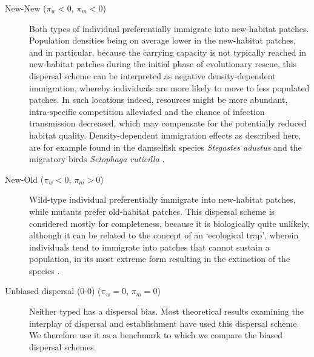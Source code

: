 \documentclass[a4paper,11pt]{article}
\begin{document}
\begin{description}
	\item[New-New ($\pi_w<0$, $\pi_m<0$)]  Both types of individual preferentially immigrate into new-habitat patches. Population densities being on average lower in the new-habitat patches, and in particular, because the carrying capacity is not typically reached in new-habitat patches during the initial phase of evolutionary rescue, this dispersal scheme can be interpreted as negative density-dependent immigration, whereby individuals are more likely to move to less populated patches. In such locations indeed, resources might be more abundant, intra-specific competition alleviated and the chance of infection transmission decreased, which may compensate for the potentially reduced habitat quality.  
	Density-dependent immigration effects as described here, are for example found in the damselfish species \textit{Stegastes adustus} \citep{turgeon_2012} and the migratory birds \textit{Setophaga ruticilla} \citep{wilson_2017}. %
	
	\item[New-Old ($\pi_w<0$, $\pi_m>0$)] Wild-type individual preferentially immigrate into new-habitat patches, while mutants prefer old-habitat patches. This dispersal scheme is considered mostly for completeness, because it is biologically quite unlikely, although it can be related to the concept of an `ecological trap', wherein individuals tend to immigrate into patches that cannot sustain a population, in its most extreme form resulting in the extinction of the species \citep{battin_2004}. 
	
	\item[Unbiased dispersal (0-0) ($\pi_w=0$, $\pi_m=0$)] Neither typed has a dispersal bias. Most theoretical results examining the interplay of dispersal and establishment have used this dispersal scheme. We therefore use it as a benchmark to which we compare the biased dispersal schemes.
\end{description}
\end{document}

